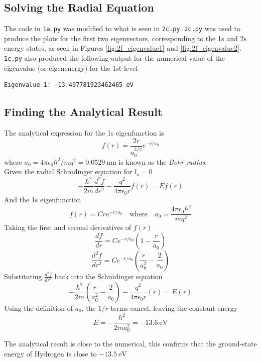 \documentclass[a4paper, 10pt]{article}
\begin{document}
\subsection{Solving the Radial Equation}
\noindent The code in \verb|1a.py| was modified to what is seen in \verb|2c.py|. \verb|2c.py| was used to produce the plots for the first two eigenvectors, corresponding to the 1s and 2s energy states, as seen in Figures \ref{fig:2f_eigenvalue1} and \ref{fig:2f_eigenvalue2}. \\

\noindent \verb|1c.py| also produced the following output for the numerical value of the eigenvalue (or eigenenergy) for the 1st level
\begin{verbatim}
Eigenvalue 1: -13.497781923462465 eV
\end{verbatim}

\subsection{Finding the Analytical Result}
\noindent The analytical expression for the 1s eigenfunction is
\begin{equation}\label{eq:2e_analytical}
    f(r) = \frac{2r}{a_0^{3/2}} e^{-r/a_0}
\end{equation}
where $a_0 = 4\pi\epsilon_0\hbar^2/mq^2 = \qty{0.0529}{\nano\meter}$ is known as the \textit{Bohr radius}.\\

\noindent Given the radial Schrödinger equation for $l_o = 0$
\[
    -\frac{\hbar^2}{2m} \frac{d^2f}{dr^2} - \frac{q^2}{4\pi\epsilon_0 r} f(r) = E f(r)
\]
\noindent And the 1s eigenfunction
\[
    f(r) = C r e^{-r/a_0} \quad \text{where} \quad a_0 = \frac{4\pi\epsilon_0\hbar^2}{mq^2}
\]
\noindent Taking the first and second derivatives of $f(r)$
\[
    \frac{df}{dr} = C e^{-r/a_0} \left( 1 - \frac{r}{a_0} \right)
\]
\[
    \frac{d^2f}{dr^2} = C e^{-r/a_0} \left( \frac{r}{a_0^2} - \frac{2}{a_0} \right)
\]
\noindent Substituting $\frac{d^2f}{dr^2}$ back into the Schrödinger equation
\[
    -\frac{\hbar^2}{2m} \left( \frac{r}{a_0^2} - \frac{2}{a_0} \right) - \frac{q^2}{4\pi\epsilon_0 r} (r) = E(r)
\]
\noindent Using the definition of $a_0$, the $1/r$ terms cancel, leaving the constant energy
\[
\boxed{
    E = -\frac{\hbar^2}{2ma_0^2} = \qty{-13.6}{\eV}
}
\]

\noindent The analytical result is close to the numerical, this confirms that the ground-state energy of Hydrogen is close to $\qty{-13.5}{\eV}$
\end{document}
